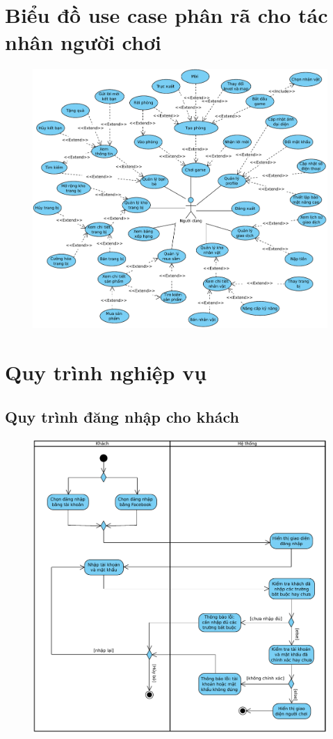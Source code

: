 \documentclass[3p]{elsarticle}
\begin{document}
\section{Biểu đồ use case phân rã cho tác nhân người chơi}
\begin{figure}[!htbp]
	\hspace*{-.5in}
	\centering
	\includegraphics[scale=.75]{images/gamer_usecase.pdf}
\end{figure}
\newpage
\section{Quy trình nghiệp vụ}
\subsection{Quy trình đăng nhập cho khách}
\begin{figure}[!htbp]
\centering
\includegraphics[scale=.7]{images/login.pdf}
\end{figure}
\newpage
\end{document}
